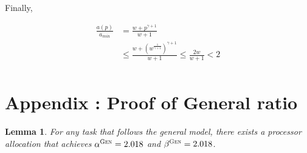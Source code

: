 \documentclass{article}
\newtheorem{lemma}{Lemma}
\newcommand\GEN{\textsc{Gen}\xspace}
\begin{document}
Finally, 

\begin{align*}
\frac{a(p)}{a_{min}} &= \frac{w+p^{\gamma+1}}{w+1} \\
&\leq \frac{w+\left(w^{\frac{1}{\gamma+1}}\right)^{\gamma+1}}{w+1}\leq \frac{2w}{w+1}<2\\
\end{align*}

\FloatBarrier 
\newpage

\section{Appendix : Proof of General ratio}


\begin{lemma}\label{lem.general}
For any task that follows the general model, there exists a processor allocation that achieves $\alpha^{\GEN}=2.018
$ and $\beta^{\GEN}=2.018$.
\end{lemma}
\end{document}
